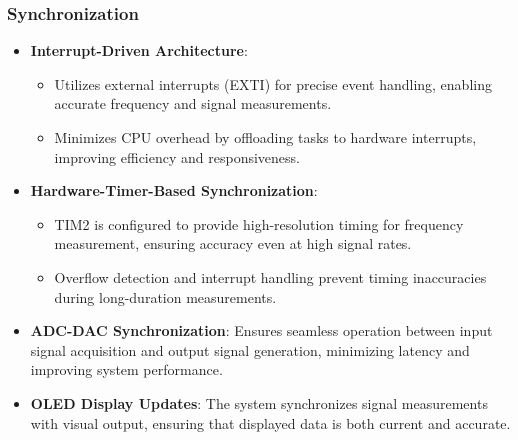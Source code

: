 \subsubsection{Synchronization}
\begin{itemize}
    \item \textbf{Interrupt-Driven Architecture}: 
        \begin{itemize}
            \item Utilizes external interrupts (EXTI) for precise event handling, enabling accurate frequency and signal measurements.
            \item Minimizes CPU overhead by offloading tasks to hardware interrupts, improving efficiency and responsiveness.
        \end{itemize}
    \item \textbf{Hardware-Timer-Based Synchronization}:
        \begin{itemize}
            \item TIM2 is configured to provide high-resolution timing for frequency measurement, ensuring accuracy even at high signal rates.
            \item Overflow detection and interrupt handling prevent timing inaccuracies during long-duration measurements.
        \end{itemize}
    \item \textbf{ADC-DAC Synchronization}: Ensures seamless operation between input signal acquisition and output signal generation, minimizing latency and improving system performance.
    \item \textbf{OLED Display Updates}: The system synchronizes signal measurements with visual output, ensuring that displayed data is both current and accurate.
\end{itemize}

